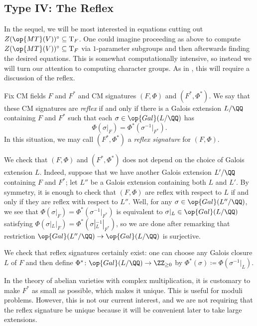 \documentclass[../thesis.tex]{subfiles}
\begin{document}
\subsection{Type IV: The Reflex} \label{subsec:reflex}
In the sequel, we will be most interested in equations cutting out $Z(\op{MT}(V))^\circ\subseteq\mathrm T_F$. One could imagine proceeding as above to compute $Z(\op{MT}(V))^\circ\subseteq\mathrm T_F$ via $1$-parameter subgroups and then afterwards finding the desired equations. This is somewhat computationally intensive, so instead we will turn our attention to computing character groups. As in \cite[Lemma~4.2]{yu-mumford-tate-cm}, this will require a discussion of the reflex.
\begin{definition}
	Fix CM fields $F$ and $F^*$ and CM signatures $(F,\Phi)$ and $(F^*,\Phi^*)$. We say that these CM signatures are \textit{reflex} if and only if there is a Galois extension $L/\QQ$ containing $F$ and $F^*$ such that each $\sigma\in\op{Gal}(L/\QQ)$ has
	\[\Phi(\sigma|_F)=\Phi^*\left(\sigma^{-1}|_{F^*}\right).\]
	In this situation, we may call $(F^*,\Phi^*)$ a \textit{reflex signature} for $(F,\Phi)$.
\end{definition}
\begin{remark}
	We check that $(F,\Phi)$ and $(F^*,\Phi^*)$ does not depend on the choice of Galois extension $L$. Indeed, suppose that we have another Galois extension $L'/\QQ$ containing $F$ and $F^*$; let $L''$ be a Galois extension containing both $L$ and $L'$. By symmetry, it is enough to check that $(F,\Phi)$ are reflex with respect to $L$ if and only if they are reflex with respect to $L''$. Well, for any $\sigma\in\op{Gal}(L''/\QQ)$, we see that $\Phi(\sigma|_F)=\Phi^*\left(\sigma^{-1}|_{F^*}\right)$ is equivalent to $\sigma|_L\in\op{Gal}(L/\QQ)$ satisfying $\Phi(\sigma|_L|_F)=\Phi^*\left(\sigma|_L^{-1}|_{F^*}\right)$, so we are done after remarking that restriction $\op{Gal}(L''/\QQ)\to\op{Gal}(L/\QQ)$ is surjective.
\end{remark}
\begin{remark}
	We check that reflex signatures certainly exist: one can choose any Galois closure $L$ of $F$ and then define $\Phi^*\colon\op{Gal}(L/\QQ)\to\ZZ_{\ge0}$ by $\Phi^*(\sigma)\coloneqq\Phi\left(\sigma^{-1}|_L\right)$.
\end{remark}
\begin{remark}
	In the theory of abelian varieties with complex multiplication, it is customary to make $F^*$ as small as possible, which makes it unique. This is useful for moduli problems. However, this is not our current interest, and we are not requiring that the reflex signature be unique because it will be convenient later to take large extensions.
\end{remark}
\end{document}
